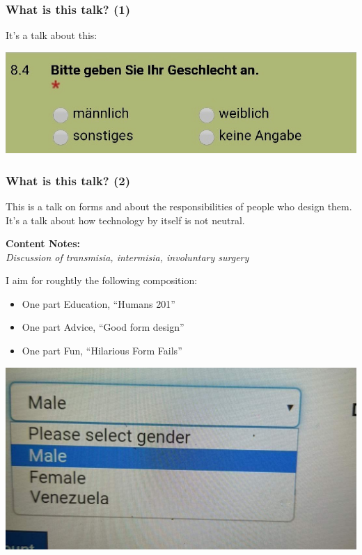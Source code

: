 \documentclass[aspectratio=169,x11names]{beamer}
\begin{document}
\begin{frame}
\frametitle{What is this talk? (1)}
\large
It's a talk about this:\medskip

\begin{center}
\includegraphics[scale=0.45]{images/Simba_01}
\end{center}
\end{frame}

\begin{frame}
\frametitle{What is this talk? (2)}
\large

This is a talk on forms and about the responsibilities of people who design them. It's a talk about how technology by itself is not neutral.

\pause\bigskip

\begin{center}
\textbf{Content Notes:}\\
\emph{Discussion of transmisia, intermisia, involuntary surgery}
\end{center}

\pause\bigskip

I aim for roughtly the following composition:
\medskip

\begin{itemize}
\item One part Education, ``Humans 201''
\item One part Advice, ``Good form design''
\item One part Fun, ``Hilarious Form Fails''
\end{itemize}
\end{frame}

\begin{frame}
\begin{center}
\includegraphics[scale=0.3]{images/ineffyble_01} 
\end{center}
\end{frame}
\end{document}
